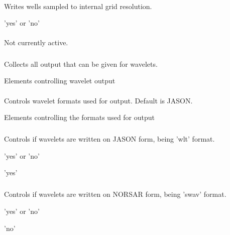 \paragraph{}
 \slist
   \item \Description Writes wells sampled to internal grid resolution.
   \item \Argument 'yes' or 'no'
   \item \Default
 \elist

\paragraph{}
 \slist
   \item \Description Not currently active.
   \item \Argument
   \item \Default
 \elist

\subsubsection{}
 \slist
   \item \Description Collects all output that can be given for wavelets.
   \item \Argument Elements controlling wavelet output
   \item \Default
 \elist

\paragraph{}
 \slist
   \item \Description Controls wavelet formats used for output. Default is JASON.
   \item \Argument Elements controlling the formats used for output
   \item \Default
 \elist

\subparagraph{}
 \slist
   \item \Description Controls if wavelets are written on JASON form, being 'wlt' format.
   \item \Argument 'yes' or 'no'
   \item \Default 'yes'
 \elist

 \subparagraph{}
 \slist
   \item \Description Controls if wavelets are written on NORSAR form, being 'swav' format.
   \item \Argument 'yes' or 'no'
   \item \Default 'no'
 \elist

